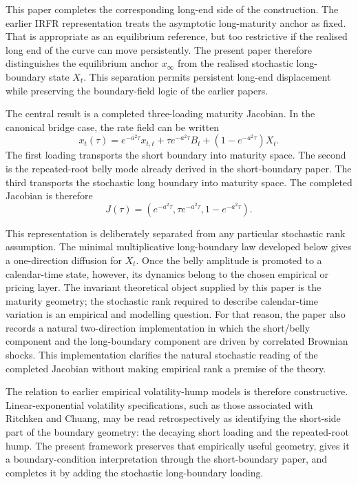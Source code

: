 \documentclass[11pt]{article}
\begin{document}
This paper completes the corresponding long-end side of the construction. The earlier IRFR representation treats the asymptotic long-maturity anchor as fixed. That is appropriate as an equilibrium reference, but too restrictive if the realised long end of the curve can move persistently. The present paper therefore distinguishes the equilibrium anchor \(x_\infty\) from the realised stochastic long-boundary state \(X_t\). This separation permits persistent long-end displacement while preserving the boundary-field logic of the earlier papers.

The central result is a completed three-loading maturity Jacobian. In the canonical bridge case, the rate field can be written
\[
x_t(\tau)
=
e^{-a^2\tau}x_{t,t}
+
\tau e^{-a^2\tau}B_t
+
\left(1-e^{-a^2\tau}\right)X_t.
\]
The first loading transports the short boundary into maturity space. The second is the repeated-root belly mode already derived in the short-boundary paper. The third transports the stochastic long boundary into maturity space. The completed Jacobian is therefore
\[
J(\tau)
=
\left(
 e^{-a^2\tau},
 \tau e^{-a^2\tau},
 1-e^{-a^2\tau}
\right).
\]

This representation is deliberately separated from any particular stochastic rank assumption. The minimal multiplicative long-boundary law developed below gives a one-direction diffusion for \(X_t\). Once the belly amplitude is promoted to a calendar-time state, however, its dynamics belong to the chosen empirical or pricing layer. The invariant theoretical object supplied by this paper is the maturity geometry; the stochastic rank required to describe calendar-time variation is an empirical and modelling question. For that reason, the paper also records a natural two-direction implementation in which the short/belly component and the long-boundary component are driven by correlated Brownian shocks. This implementation clarifies the natural stochastic reading of the completed Jacobian without making empirical rank a premise of the theory.

The relation to earlier empirical volatility-hump models is therefore constructive. Linear-exponential volatility specifications, such as those associated with Ritchken and Chuang, may be read retrospectively as identifying the short-side part of the boundary geometry: the decaying short loading and the repeated-root hump. The present framework preserves that empirically useful geometry, gives it a boundary-condition interpretation through the short-boundary paper, and completes it by adding the stochastic long-boundary loading.
\end{document}
